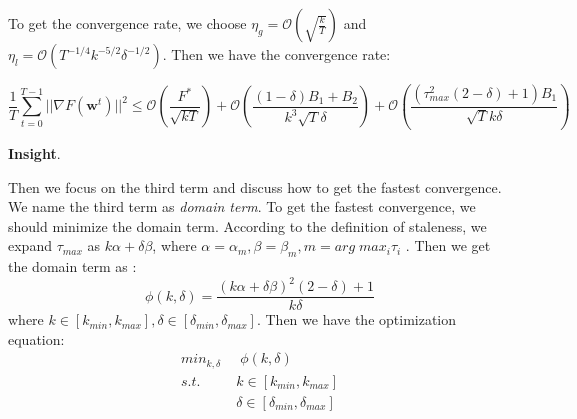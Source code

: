 \documentclass{article}
\begin{document}
To get the convergence rate, we choose $\eta_g = \mathcal{O}(\sqrt{\frac{k}{T}})$ and $\eta_l = \mathcal{O}(T^{-1/4}k^{-5/2}\delta^{-1/2})$. Then we have the convergence rate:

\begin{equation}
\frac{1}{T}\sum_{t = 0}^{T - 1}||\nabla F(\mathbf{w}^{t})||^2 
\le
\mathcal{O}(\frac{F^{*}}{\sqrt{kT}}) 
+ \mathcal{O}(\frac{(1 - \delta)B_1+B_2}{k^3\sqrt{T}\delta})
+ \mathcal{O}(\frac{(\tau_{max}^2(2 - \delta) + 1)B_1}{\sqrt{T}k\delta})
\label{convergence rate}
\end{equation}

\textbf{Insight}.

Then we focus on the third term and discuss how to get the fastest convergence. We name the third term as \textit{domain term}. To get the fastest convergence, we should minimize the domain term. According to the definition of staleness, we expand $\tau_{max}$ as $k\alpha + \delta \beta$, where $\alpha = \alpha_m, \beta = \beta_m, m = arg\; max_{i} \tau_{i}$ . Then we get the domain term as :
\begin{equation}
\phi(k, \delta) = \frac{(k\alpha + \delta\beta)^2(2 - \delta) + 1}{k\delta}
\end{equation}
where $k \in [k_{min}, k_{max}], \delta \in [\delta_{min}, \delta_{max}]$. Then we have the optimization equation:
\begin{align*}
min_{k, \delta} &\;\; \phi(k,\delta)
\\
s.t. &\;  k \in [k_{min}, k_{max}]
\\
&\; \delta \in [\delta_{min}, \delta_{max}]
\end{align*}
 




\end{document}
